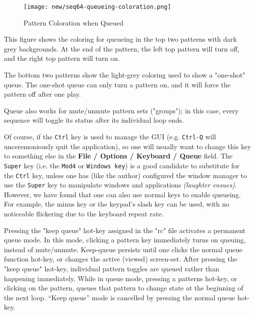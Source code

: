 \begin{figure}[H]
   \centering 
   \texttt{[image: new/seq64-queueing-coloration.png]}
   \caption{Pattern Coloration when Queued}
   \label{fig:seq64_queueing_coloration}
\end{figure}

   This figure shows the coloring for queueing in the top two patterns with
   dark grey backgrounds.  At the end of the pattern, the left top pattern will
   turn off, and the right top pattern will turn on.

   The bottom two patterns show the light-grey coloring used to show
   a "one-shot" queue.  The one-shot queue can only turn a pattern on, and it
   will force the pattern off after one play.

   Queue also works for mute/unmute pattern sets ("groups"); in this case,
   every sequence will toggle its status after its individual loop ends. 

   Of course, if the \texttt{Ctrl} key is used to manage the GUI (e.g.
   \texttt{Ctrl-Q} will unceremoniously quit the application), so one will
   usually want to change this key to something else in the
   \textbf{File / Options / Keyboard / Queue} field.
   The \texttt{Super} key (i.e. the \texttt{Mod4} or \texttt{Windows key}) is a
   good candidate to substitute for the \texttt{Ctrl} key, unless one has (like
   the author)
   configured the window manager to use the \texttt{Super} key to manipulate
   windows and applications \textsl{(laughter ensues)}.
   However, we have found that one can also use normal keys to enable queueing.
   For example, the minus key or the keypad's slash key can be used, with no
   noticeable flickering due to the keyboard repeat rate.

   Pressing the "keep queue" hot-key
   assigned in the "rc" file activates a permanent queue mode.
   In this mode, clicking a pattern key immediately turns on queuing, instead
   of mute/unmute. 
   Keep-queue persists until one clicks the normal queue function hot-key,
   or changes the active (viewed) screen-set. 
   After pressing the "keep queue" hot-key, individual pattern
   toggles are queued rather than happening immediately.
   While in queue mode, pressing a patterns hot-key, or clicking on the
   pattern, queues that pattern to change state at the beginning of the next
   loop.
   “Keep queue” mode is cancelled by pressing the normal queue hot-key.

